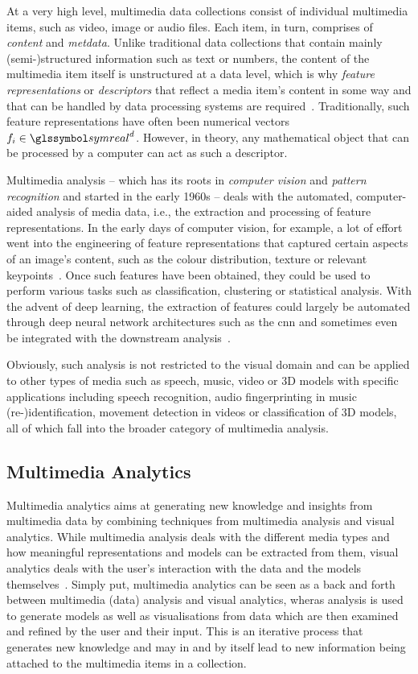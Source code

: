At a very high level, multimedia data collections consist of individual multimedia items, such as video, image or audio files. Each item, in turn, comprises of \emph{content} and \emph{metdata}. Unlike traditional data collections that contain mainly (semi-)structured information such as text or numbers, the content of the multimedia item itself is unstructured at a data level, which is why \emph{feature representations} or \emph{descriptors} that reflect a media item's content in some way and that can be handled by data processing systems are required~\cite{Zahalka:2014towards}. Traditionally, such feature representations have often been numerical vectors $f_i \in \symreal^d$. However, in theory, any mathematical object that can be processed by a computer can act as such a descriptor. 

Multimedia analysis -- which has its roots in \emph{computer vision} and \emph{pattern recognition} and started in the early 1960s -- deals with the automated, computer-aided analysis of media data, i.e., the extraction and processing of feature representations. In the early days of computer vision, for example, a lot of effort went into the engineering of feature representations that captured certain aspects of an image's content, such as the colour distribution, texture or relevant keypoints~\cite{Lowe:1999object,Bay:2006surf}. Once such features have been obtained, they could be used to perform various tasks such as classification, clustering or statistical analysis. With the advent of deep learning, the extraction of features could largely be automated through deep neural network architectures such as the \acrfull{cnn} and sometimes even be integrated with the downstream analysis~\cite{Goodfellow:2016deep}. 

Obviously, such analysis is not restricted to the visual domain and can be applied to other types of media such as speech, music, video or 3D models with specific applications including speech recognition, audio fingerprinting in music (re-)identification, movement detection in videos or classification of 3D models, all of which fall into the broader category of multimedia analysis.

\subsection{Multimedia Analytics}

Multimedia analytics aims at generating new knowledge and insights from multimedia data by combining techniques from multimedia analysis and visual analytics. While multimedia analysis deals with the different media types and how meaningful representations and models can be extracted from them, visual analytics deals with the user's interaction with the data and the models themselves~\cite{Chinchor:2010Multimedia,Keim:2010mastering}. Simply put, multimedia analytics can be seen as a back and forth between multimedia (data) analysis and visual analytics, wheras analysis is used to generate models as well as visualisations from data which are then examined and refined by the user and their input. This is an iterative process that generates new knowledge and may in and by itself lead to new information being attached to the multimedia items in a collection.

